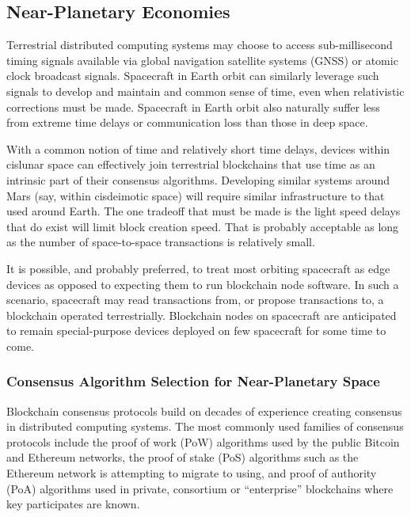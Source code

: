 \documentclass[]{aiaa-tc}%
\begin{document}
\subsection{Near-Planetary Economies}

Terrestrial distributed computing systems may choose to access sub-millisecond timing signals available via global navigation satellite systems (GNSS) or atomic clock broadcast signals. Spacecraft in Earth orbit can similarly leverage such signals to develop and maintain and common sense of time, even when relativistic corrections must be made. Spacecraft in Earth orbit also naturally suffer less from extreme time delays or communication loss than those in deep space. 

With a common notion of time and relatively short time delays, devices within cislunar space can effectively join terrestrial blockchains that use time as an intrinsic part of their consensus algorithms. Developing similar systems around Mars (say, within cisdeimotic space) will require similar infrastructure to that used around Earth. The one tradeoff that must be made is the light speed delays that do exist will limit block creation speed. That is probably acceptable as long as the number of space-to-space transactions is relatively small. 

It is possible, and probably preferred, to treat most orbiting spacecraft as edge devices as opposed to expecting them to run blockchain node software. In such a scenario, spacecraft may read transactions from, or propose transactions to, a blockchain operated terrestrially. Blockchain nodes on spacecraft are anticipated to remain special-purpose devices deployed on few spacecraft for some time to come.

\subsubsection{Consensus Algorithm Selection for Near-Planetary Space}

Blockchain consensus protocols build on decades of experience creating consensus in distributed computing systems. The most commonly used families of consensus protocols include the proof of work (PoW) algorithms used by the public Bitcoin and Ethereum networks, the proof of stake (PoS) algorithms such as the Ethereum network is attempting to migrate to using, and proof of authority (PoA) algorithms used in private, consortium or ``enterprise'' blockchains where key participates are known.
\end{document}
